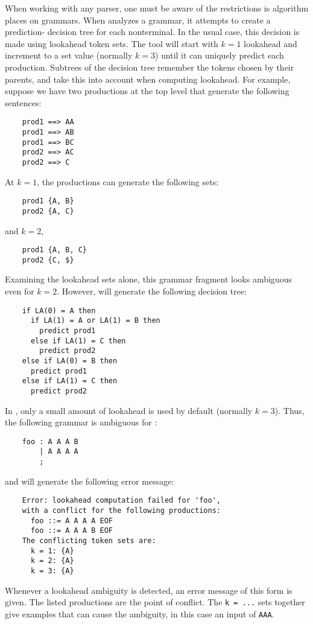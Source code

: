 When working with any parser, one must be aware of the restrictions is algorithm places on grammars.
When \antlr{} analyzes a grammar, it attempts to create a prediction-
decision tree for each nonterminal.  In the usual case, this decision
is made using lookahead token sets.  The tool will start with $k = 1$
lookahead and increment to a set value (normally $k = 3$) until it can
uniquely predict each production.  Subtrees of the decision tree
remember the tokens chosen by their parents, and take this into account
when computing lookahead.  For example, suppose we have two productions
at the top level that generate the following sentences:
\begin{verbatim}
    prod1 ==> AA
    prod1 ==> AB
    prod1 ==> BC
    prod2 ==> AC
    prod2 ==> C
\end{verbatim}
At $k = 1$, the productions can generate the following sets:
\begin{verbatim}
    prod1 {A, B}
    prod2 {A, C}
\end{verbatim}
and $k = 2$,
\begin{verbatim}
    prod1 {A, B, C}
    prod2 {C, $}
\end{verbatim}
Examining the lookahead sets alone, this grammar fragment looks ambiguous
even for $k = 2$.  However, \antlr{} will generate the following decision
tree:
\begin{verbatim}
    if LA(0) = A then
      if LA(1) = A or LA(1) = B then
        predict prod1
      else if LA(1) = C then
        predict prod2
    else if LA(0) = B then
      predict prod1
    else if LA(1) = C then
      predict prod2
\end{verbatim}

In \antlr{}, only a small amount of lookahead is used by default (normally $k = 3$).  Thus, the following grammar is ambiguous for \antlr{}:
\begin{verbatim}
    foo : A A A B
        | A A A A
        ;
\end{verbatim}
and will generate the following error message:
\begin{verbatim}
    Error: lookahead computation failed for 'foo',
    with a conflict for the following productions:
      foo ::= A A A A EOF
      foo ::= A A A B EOF
    The conflicting token sets are:
      k = 1: {A}
      k = 2: {A}
      k = 3: {A}
\end{verbatim}
Whenever a lookahead ambiguity is detected, an error message of this form is given.  The listed productions are the point of conflict.  The {\tt k = ...} sets together give examples that can cause the ambiguity, in this case an input of {\tt AAA}.

